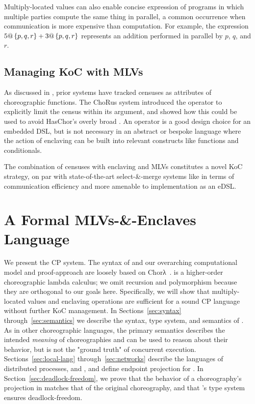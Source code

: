 Multiply-located values can also enable concise expression of programs in which multiple parties compute the same thing in parallel,
a common occurrence when communication is more expensive than computation.
For example, the \HLSCentral expression $5@\left\{p,q,r\right\}+3@\left\{p,q,r\right\}$ represents an addition performed in parallel by $p$, $q$, and $r$.

\subsection{Managing KoC with MLVs}
\label{sec:enclaves}

As discussed in , prior systems have tracked censuses as attributes of choreographic functions.
The ChoRus system introduced the  operator to explicitly limit the census within its argument,
and showed how this could be used to avoid HasChor's overly broad .
An  operator is a good design choice for an embedded DSL,
but is not necessary in an abstract or bespoke language where the action of enclaving can be built into relevant constructs like
functions and conditionals.

The combination of censuses with enclaving and MLVs constitutes a novel KoC strategy,
on par with state-of-the-art select-\&-merge systems like \chorLambda in terms of communication efficiency
and more amenable to implementation as an eDSL.


\section{A Formal MLVs-\&-Enclaves Language}\label{sec:more-formalism}


We present the \HLSCentral CP system.
The syntax of \HLSCentral and our overarching computational model and proof-approach are loosely based on
Chorλ~\cite{chor-lambda}.
\HLSCentral is a higher-order choreographic lambda calculus;
we omit recursion and polymorphism because they are orthogonal to our goals here.
Specifically, we will show that multiply-located values and enclaving operations are sufficient for a sound
CP language without further KoC management.
In Sections~\ref{sec:syntax} through~\ref{sec:semantics}
we describe the syntax, type system, and semantics of \HLSCentral.
As in other choreographic languages, the primary semantics describes the intended \emph{meaning} of choreographies
and can be used to reason about their behavior,
but is not the "ground truth" of concurrent execution.
Sections~\ref{sec:local-lang} through~\ref{sec:networks} describe the languages of distributed processes,
\HLSLocal and \HLSNet,
and define endpoint projection for \HLSCentral.
%
In Section~\ref{sec:deadlock-freedom}, we prove that the behavior of a choreography's projection in \HLSNet
matches that of the original \HLSCentral choreography, and that \HLSCentral's type system ensures deadlock-freedom.

